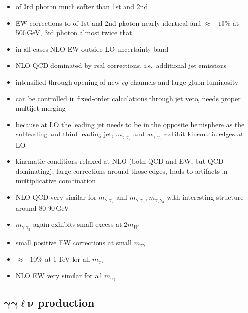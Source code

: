 \begin{itemize}
  \item \pT of 3rd photon much softer than 1st and 2nd
  \item EW corrections to \pT of 1st and 2nd photon nearly identical and 
        $\approx -10\%$ at 500\,GeV, 3rd photon almost twice that.
  \item in all cases NLO EW outside LO uncertainty band
  \item NLO QCD dominated by real corrections, i.e.\ additional 
        jet emissions
  \item intensified through opening of new $qg$ channels and large 
        gluon luminosity
  \item can be controlled in fixed-order calculations through jet veto, 
        needs proper multijet merging
  \item because at LO the leading jet needs to be in the opposite 
        hemisphere as the subleading and third leading jet, 
        $m_{\gamma_1\gamma_2}$ and $m_{\gamma_1\gamma_3}$ 
        exhibit kinematic edges at LO
  \item kinematic conditions relaxed at NLO (both QCD and EW, 
        but QCD dominating), large corrections around those edges, 
        leads to artifacts in multiplicative combination
  \item NLO QCD very similar for $m_{\gamma_1\gamma_2}$ and 
	$m_{\gamma_1\gamma_3}$, $m_{\gamma_2\gamma_3}$ with interesting 
	structure around 80-90\,GeV
  \item $m_{\gamma_1\gamma_2}$ again exhibits small excess at $2m_W$
  \item small positive EW corrections at small $m_{\gamma\gamma}$ 
  \item $\approx -10\%$ at 1\,TeV for all $m_{\gamma\gamma}$ 
  \item NLO EW very similar for all $m_{\gamma\gamma}$ 
\end{itemize}



\subsection{\texorpdfstring{$\boldsymbol{\gamma\gamma\ell\nu}$}{aalnu} production}
\label{sec:results:aaw}



